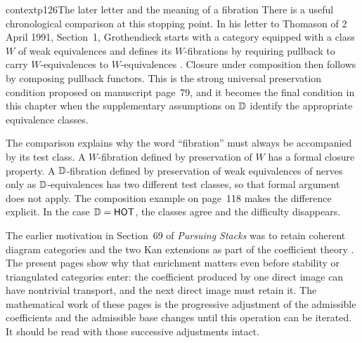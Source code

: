 \begin{dcomment}{context}{p126}{The later letter and the meaning of a fibration}
There is a useful chronological comparison at this stopping point. In his letter to Thomason of 2 April 1991, Section~1, Grothendieck starts with a category equipped with a class $W$ of weak equivalences and defines its $W$-fibrations by requiring pullback to carry $W$-equivalences to $W$-equivalences \citep{Grothendieck1991Letter}. Closure under composition then follows by composing pullback functors. This is the strong universal preservation condition proposed on manuscript page~79, and it becomes the final condition in this chapter when the supplementary assumptions on $\mathbb{D}$ identify the appropriate equivalence classes.

The comparison explains why the word ``fibration'' must always be accompanied by its test class. A $W$-fibration defined by preservation of $W$ has a formal closure property. A $\mathbb{D}$-fibration defined by preservation of weak equivalences of nerves only as $\mathbb{D}$-equivalences has two different test classes, so that formal argument does not apply. The composition example on page~118 makes the difference explicit. In the case $\mathbb{D}=\mathsf{HOT}$, the classes agree and the difficulty disappears.

The earlier motivation in Section~69 of \emph{Pursuing Stacks} was to retain coherent diagram categories and the two Kan extensions as part of the coefficient theory \citep{Grothendieck1983}. The present pages show why that enrichment matters even before stability or triangulated categories enter: the coefficient produced by one direct image can have nontrivial transport, and the next direct image must retain it. The mathematical work of these pages is the progressive adjustment of the admissible coefficients and the admissible base changes until this operation can be iterated. It should be read with those successive adjustments intact.
\end{dcomment}
